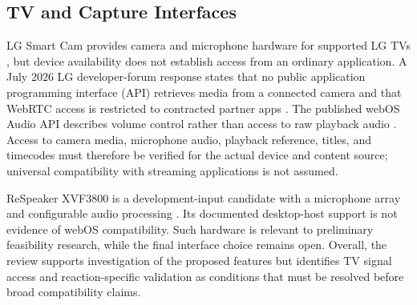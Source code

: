 \subsection{TV and Capture Interfaces}

LG Smart Cam provides camera and microphone hardware for supported LG TVs \cite{ref23}, but device availability does not establish access from an ordinary application. A July 2026 LG developer-forum response states that no public application programming interface (API) retrieves media from a connected camera and that WebRTC access is restricted to contracted partner apps \cite{ref24}. The published webOS Audio API describes volume control rather than access to raw playback audio \cite{ref25}. Access to camera media, microphone audio, playback reference, titles, and timecodes must therefore be verified for the actual device and content source; universal compatibility with streaming applications is not assumed.

ReSpeaker XVF3800 is a development-input candidate with a microphone array and configurable audio processing \cite{ref26}. Its documented desktop-host support is not evidence of webOS compatibility. Such hardware is relevant to preliminary feasibility research, while the final interface choice remains open. Overall, the review supports investigation of the proposed features but identifies TV signal access and reaction-specific validation as conditions that must be resolved before broad compatibility claims.
